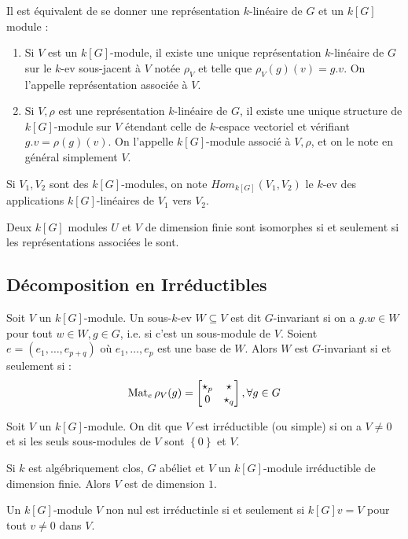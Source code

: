 \documentclass{cours}
\begin{document}
\begin{proposition}
    Il est équivalent de se donner une représentation $k$-linéaire de $G$ et un $k[G]$ module :
    \begin{enumerate}
        \item Si $V$ est un $k[G]$-module, il existe une unique représentation $k$-linéaire de $G$ sur le $k$-ev sous-jacent à $V$ notée $\rho_{V}$ et telle que $\rho_{V}(g)(v) = g.v$. On l'appelle représentation associée à $V$.
        \item Si $V, \rho$ est une représentation $k$-linéaire de $G$, il existe une unique structure de $k[G]$-module sur $V$ étendant celle de $k$-espace vectoriel et vérifiant $g.v = \rho(g)(v)$. On l'appelle $k[G]$-module associé à $V, \rho$, et on le note en général simplement $V$.
    \end{enumerate}
\end{proposition}

\begin{definition}
    Si $V_{1}, V_{2}$ sont des $k[G]$-modules, on note $Hom_{k[G]}(V_{1}, V_{2})$ le $k$-ev des applications $k[G]$-linéaires de $V_{1}$ vers $V_{2}$.
\end{definition}

\begin{proposition}
    Deux $k[G]$ modules $U$ et $V$ de dimension finie sont isomorphes si et seulement si les représentations associées le sont.
\end{proposition}

\subsection{Décomposition en Irréductibles}
\begin{definition}
    Soit $V$ un $k[G]$-module. Un sous-$k$-ev $W \subseteq V$ est dit $G$-invariant si on a $g.w \in W$ pour tout $w \in W, g \in G$, i.e. si c'est un sous-module de $V$. Soient $e = \left(e_{1}, \ldots, e_{p +q}\right)$ où $e_{1}, \ldots, e_{p}$ est une base de $W$. Alors $W$ est $G$-invariant si et seulement si :
    \[
        \operatorname{Mat}_{e}\rho_{V}(g) = \left[\begin{matrix}
                \star_{p} & \star     \\
                0         & \star_{q}
            \end{matrix}\right], \forall g \in G
    \]
\end{definition}

\begin{definition}
    Soit $V$ un $k[G]$-module. On dit que $V$ est irréductible (ou simple) si on a $V \neq 0$ et si les seuls sous-modules de $V$ sont $\left\{0\right\}$ et $V$.
\end{definition}
\begin{proposition}
    Si $k$ est algébriquement clos, $G$ abéliet et $V$ un $k[G]$-module irréductible de dimension finie. Alors $V$ est de dimension $1$.
\end{proposition}
\begin{proposition}
    Un $k[G]$-module $V$ non nul est irréductinle si et seulement si $k[G]v = V$ pour tout $v \neq 0$ dans $V$.
\end{proposition}
\end{document}
